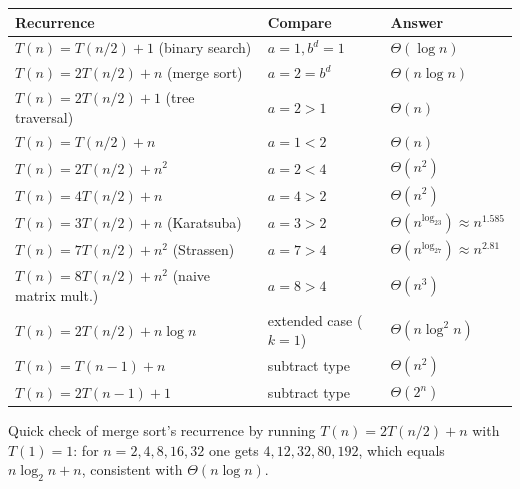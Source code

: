 \documentclass[11pt,a4paper]{article}
\begin{document}
\begin{center}
\begin{tabularx}{\textwidth}{>{\raggedright\arraybackslash}p{5.0cm} >{\raggedright\arraybackslash}p{4.3cm} >{\raggedright\arraybackslash}X}
\toprule
\textbf{Recurrence} & \textbf{Compare} & \textbf{Answer}\\
\midrule
$T(n)=T(n/2)+1$ (binary search) & $a=1,b^d=1$ & $\Theta(\log n)$\\
$T(n)=2T(n/2)+n$ (merge sort) & $a=2=b^d$ & $\Theta(n\log n)$\\
$T(n)=2T(n/2)+1$ (tree traversal) & $a=2>1$ & $\Theta(n)$\\
$T(n)=T(n/2)+n$ & $a=1<2$ & $\Theta(n)$\\
$T(n)=2T(n/2)+n^2$ & $a=2<4$ & $\Theta(n^2)$\\
$T(n)=4T(n/2)+n$ & $a=4>2$ & $\Theta(n^2)$\\
$T(n)=3T(n/2)+n$ (Karatsuba) & $a=3>2$ & $\Theta(n^{\log_23})\approx n^{1.585}$\\
$T(n)=7T(n/2)+n^2$ (Strassen) & $a=7>4$ & $\Theta(n^{\log_27})\approx n^{2.81}$\\
$T(n)=8T(n/2)+n^2$ (naive matrix mult.) & $a=8>4$ & $\Theta(n^3)$\\
$T(n)=2T(n/2)+n\log n$ & extended case ($k=1$) & $\Theta(n\log^2n)$\\
$T(n)=T(n-1)+n$ & subtract type & $\Theta(n^2)$\\
$T(n)=2T(n-1)+1$ & subtract type & $\Theta(2^n)$\\
\bottomrule
\end{tabularx}
\end{center}
Quick check of merge sort's recurrence by running $T(n)=2T(n/2)+n$ with $T(1)=1$: for $n=2,4,8,16,32$ one gets $4,12,32,80,192$, which equals $n\log_2n+n$, consistent with $\Theta(n\log n)$.
\end{document}
